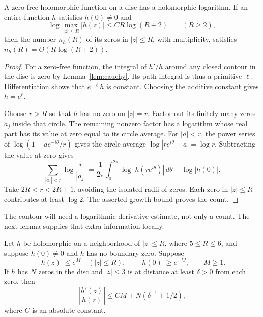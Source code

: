 \documentclass[11pt]{article}
\numberwithin{equation}{section}
\begin{document}
\begin{lemma}
\label{lem:jensen}
A zero-free holomorphic function on a disc has a holomorphic logarithm.
If an entire function $h$ satisfies $h(0)\ne0$ and
\[
 \log\max_{|z|\leq R}|h(z)|\leq C R\log(R+2)\qquad(R\geq2),
\]
then the number $n_h(R)$ of its zeros in $|z|\leq R$, with multiplicity,
satisfies $n_h(R)=O(R\log(R+2))$.
\end{lemma}

\begin{proof}
For a zero-free function, the integral of $h'/h$ around any closed contour
in the disc is zero by Lemma~\ref{lem:cauchy}.  Its path integral is thus a
primitive $\ell$.  Differentiation shows that $e^{-\ell}h$ is constant.
Choosing the additive constant gives $h=e^\ell$.

Choose $r>R$ so that $h$ has no zero on $|z|=r$.
Factor out its finitely many zeros $a_j$ inside that circle.
The remaining nonzero factor has a logarithm whose real part has its value
at zero equal to its circle average.
For $|a|<r$, the power series of $\log(1-ae^{-i\theta}/r)$ gives
the circle average $\log|re^{i\theta}-a|=\log r$.
Subtracting the value at zero gives
\[
 \sum_{|a_j|<r}\log\frac r{|a_j|}
 =\frac1{2\pi}\int_0^{2\pi}\log|h(re^{i\theta})|\,d\theta
       -\log|h(0)|.
\]
Take $2R<r<2R+1$, avoiding the isolated radii of zeros.
Each zero in $|z|\leq R$ contributes at least $\log2$.
The asserted growth bound proves the count.
\end{proof}

The contour will need a logarithmic derivative estimate, not only a count.
The next lemma supplies that extra information locally.

\begin{lemma}
\label{lem:local-log}
Let $h$ be holomorphic on a neighborhood of $|z|\leq R$, where
$5\leq R\leq6$, and suppose $h(0)\ne0$ and $h$ has no boundary zero.
Suppose
\[
 |h(z)|\leq e^M\quad(|z|\leq R),\qquad |h(0)|\geq e^{-M},\qquad M\geq1.
\]
If $h$ has $N$ zeros in the disc and $|z|\leq3$ is at distance at least
$\delta>0$ from each zero, then
\[
 \left|\frac{h'(z)}{h(z)}\right|
 \leq C M+N(\delta^{-1}+1/2),
\]
where $C$ is an absolute constant.
\end{lemma}
\end{document}
